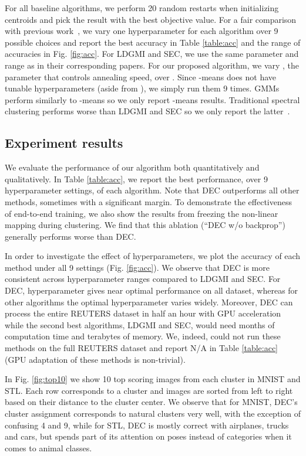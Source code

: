 \documentclass{article}
\begin{document}
For all baseline algorithms, we perform 20 random restarts when initializing centroids and pick the result with the best objective value.
For a fair comparison with previous work~\citep{yang2010image}, we vary one hyperparameter for each algorithm over 9 possible choices and report the best accuracy in Table \ref{table:acc} and the range of accuracies in Fig. \ref{fig:acc}.
For LDGMI and SEC, we use the same parameter and range as in their corresponding papers.
For our proposed algorithm, we vary , the parameter that controls annealing speed, over .
Since -means does not have tunable hyperparameters (aside from ), we simply run them 9 times.
GMMs perform similarly to -means so we only report -means results. Traditional spectral clustering performs worse than LDGMI and SEC so we only report the latter~\citep{yang2010image,nie2011spectral}.

\subsection{Experiment results}


We evaluate the performance of our algorithm both quantitatively and qualitatively.
In Table \ref{table:acc}, we report the best performance, over 9 hyperparameter settings, of each algorithm.
Note that DEC outperforms all other methods, sometimes with a significant margin.
To demonstrate the effectiveness of end-to-end training, we also show the
results from freezing the non-linear mapping  during clustering.
We find that this ablation (``DEC w/o backprop'') generally performs worse than DEC. 

In order to investigate the effect of hyperparameters, we plot the accuracy of
each method under all 9 settings (Fig. \ref{fig:acc}).
We observe that DEC is more consistent across hyperparameter ranges compared to LDGMI and SEC.
For DEC, hyperparameter  gives near optimal performance on all dataset, whereas for other algorithms the optimal hyperparameter varies widely.
Moreover, DEC can process the entire REUTERS dataset in half an hour with GPU acceleration while the second best algorithms, LDGMI and SEC, would need months of computation time and terabytes of memory.
We, indeed, could not run these methods on the full REUTERS dataset and report
N/A in Table \ref{table:acc} (GPU adaptation of these methods is non-trivial).

In Fig. \ref{fig:top10} we show 10 top scoring images from each cluster in MNIST and STL.
Each row corresponds to a cluster and images are sorted from left to right based on their distance to the cluster center.
We observe that for MNIST, DEC's cluster assignment corresponds to natural clusters very well, with the exception of confusing 4 and 9, while for STL, DEC is mostly correct with airplanes, trucks and cars, but spends part of its attention on poses instead of categories when it comes to animal classes.
 
\end{document}
